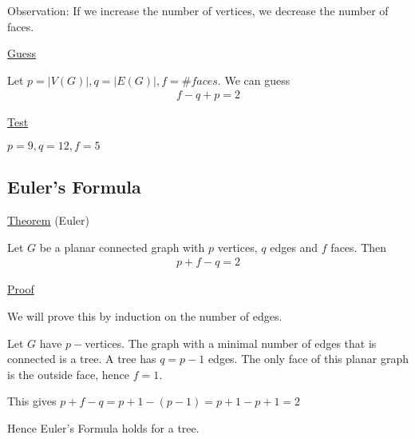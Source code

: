 \documentclass{article}
\begin{document}
Observation: If we increase the number of vertices, we decrease the number of faces. 

\underline{Guess}

Let $p = |V(G)|, q = |E(G)|, f = \# faces$. We can guess
\begin{align*}
    f - q + p = 2
\end{align*}

\underline{Test}

\begin{center}
\end{center}

$p = 9, q = 12, f = 5$

\subsection{Euler's Formula}

\underline{Theorem} (Euler)

Let $G$ be a planar connected graph with $p$ vertices, $q$ edges and $f$ faces. Then
\begin{align*}
    p + f - q = 2
\end{align*}

\underline{Proof}

We will prove this by induction on the number of edges. 

Let $G$ have $p-$vertices. The graph with a minimal number of edges that is connected is a tree. A tree has $q = p-1$ edges. The only face of this planar graph is the outside face, hence $f=1$.

This gives $p + f - q = p + 1 - (p - 1) = p +1 - p + 1 = 2$

Hence Euler's Formula holds for a tree. 
\end{document}
